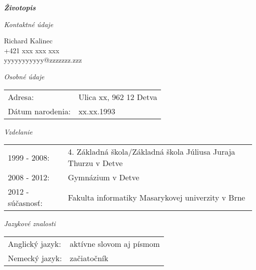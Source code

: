 \documentclass{article}
\begin{document}
\begin{center}
\Huge
\textbf{\textit{Životopis}}
\end{center}	
\begin{flushleft}
\bigskip

\Large
\textit{\textsf{Kontaktné údaje\\}}
\normalsize

\smallskip

Richard Kalinec\\
+421 xxx xxx xxx\\
yyyyyyyyyyy@zzzzzzz.zzz\\

\bigskip

\Large
\textit{\textsf{Osobné údaje\\}}
\normalsize
\smallskip

\begin{adjustwidth}{-6pt}{}
\begin{tabular}{l l}
	Adresa: & Ulica xx, 962 12 Detva \\
	Dátum narodenia: & xx.xx.1993
\end{tabular}
\end{adjustwidth}

\bigskip

\Large
\textit{\textsf{Vzdelanie\\}}
\normalsize

\smallskip

\begin{adjustwidth}{-6pt}{}
\begin{tabular}{l l}
	1999 - 2008: & 4. Základná škola/Základná škola Júliusa Juraja Thurzu v Detve\\
	2008 - 2012: & Gymnázium v Detve\\
	2012 - súčasnosť: & Fakulta informatiky Masarykovej univerzity v Brne\\
\end{tabular}
\end{adjustwidth}

\bigskip

\Large
\textit{\textsf{Jazykové znalosti\\}}
\normalsize

\smallskip

\begin{adjustwidth}{-6pt}{}
\begin{tabular}{l l}
Anglický jazyk: & aktívne slovom aj písmom \\
Nemecký jazyk: & začiatočník
\end{tabular}
\end{adjustwidth}


\end{flushleft}
\end{document}
